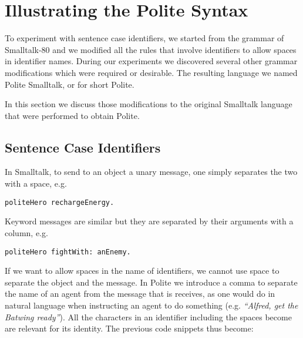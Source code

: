 
\section{Illustrating the Polite Syntax}

To experiment with sentence case identifiers, we started from the grammar of Smalltalk-80 \cite{Gold83a} and we modified all the rules that involve identifiers to allow spaces in identifier names. During our experiments we discovered several other grammar modifications which were required or desirable. The resulting language we named Polite Smalltalk, or for short Polite.

In this section we discuss those modifications to the original  Smalltalk language that were performed to obtain Polite.




\newcommand{\comma}{{`,' }}
\newcommand{\plus}{{`+' }}
\newcommand{\code}[1]{{\texttt{#1}}}

\subsection{Sentence Case Identifiers}
In Smalltalk, to send to an object a unary message, one simply separates the two with a space, e.g.

\begin{verbatim} 
politeHero rechargeEnergy.
\end{verbatim}

Keyword messages are similar but they are separated by their arguments with a column, e.g.

\begin{verbatim} 
politeHero fightWith: anEnemy.
\end{verbatim}


If we want to allow spaces in the name of identifiers, we cannot use space to separate the object and the message. In Polite we introduce a comma to separate the name of an agent from the message that is receives, as one would do in natural language when instructing an agent to do something (e.g. {\em ``Alfred, get the Batwing ready''}). All the characters in an identifier including the spaces become are relevant for its identity. The previous code snippets thus become: 

